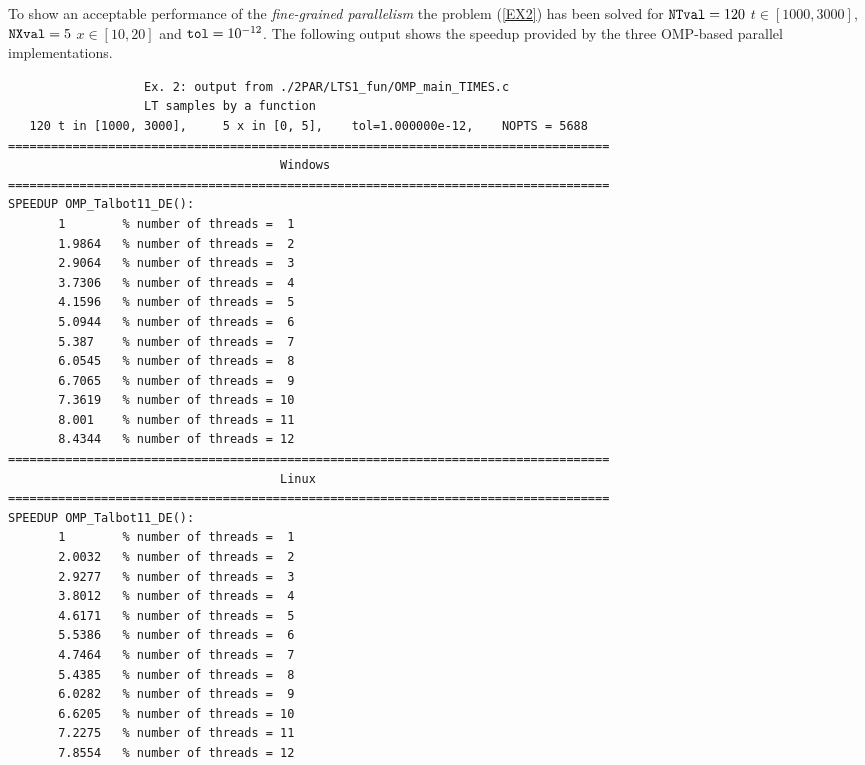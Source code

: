 \documentclass[a4paper,10pt]{report}%
\begin{document}
To show an acceptable performance of the {\em fine-grained parallelism} the problem (\ref{EX2}) has been
solved for ${\tt NTval}=120$ $t\in[1000,3000]$, ${\tt NXval}=5$ $x\in[10,20]$ and ${\tt tol}=10^{-12}$.
The following output shows the speedup provided by the three OMP-based parallel implementations.
\begin{lstlisting}
                   Ex. 2: output from ./2PAR/LTS1_fun/OMP_main_TIMES.c
                   LT samples by a function
   120 t in [1000, 3000],     5 x in [0, 5],    tol=1.000000e-12,    NOPTS = 5688
====================================================================================
                                      Windows
====================================================================================
SPEEDUP OMP_Talbot11_DE():
       1        % number of threads =  1
       1.9864   % number of threads =  2
       2.9064   % number of threads =  3
       3.7306   % number of threads =  4
       4.1596   % number of threads =  5
       5.0944   % number of threads =  6
       5.387    % number of threads =  7
       6.0545   % number of threads =  8
       6.7065   % number of threads =  9
       7.3619   % number of threads = 10
       8.001    % number of threads = 11
       8.4344   % number of threads = 12
====================================================================================
                                      Linux
====================================================================================
SPEEDUP OMP_Talbot11_DE():
       1        % number of threads =  1
       2.0032   % number of threads =  2
       2.9277   % number of threads =  3
       3.8012   % number of threads =  4
       4.6171   % number of threads =  5
       5.5386   % number of threads =  6
       4.7464   % number of threads =  7
       5.4385   % number of threads =  8
       6.0282   % number of threads =  9
       6.6205   % number of threads = 10
       7.2275   % number of threads = 11
       7.8554   % number of threads = 12


\end{lstlisting}
\end{document}
